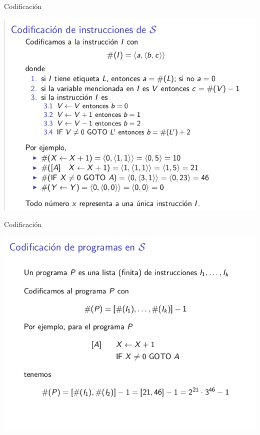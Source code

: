 \documentclass{beamer}
\begin{document}
\begin{frame}{Codificación}
	\begin{center}
		\includegraphics[scale=0.35]{instrucciones.png}
	\end{center}
\end{frame}

\begin{frame}{Codificación}
	\begin{center}
		\includegraphics[scale=0.35]{programa.png}
	\end{center}
\end{frame}
\end{document}
